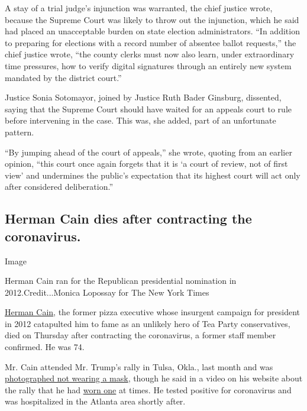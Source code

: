 A stay of a trial judge's injunction was warranted, the chief justice
wrote, because the Supreme Court was likely to throw out the injunction,
which he said had placed an unacceptable burden on state election
administrators. ``In addition to preparing for elections with a record
number of absentee ballot requests,'' the chief justice wrote, ``the
county clerks must now also learn, under extraordinary time pressures,
how to verify digital signatures through an entirely new system mandated
by the district court.''

Justice Sonia Sotomayor, joined by Justice Ruth Bader Ginsburg,
dissented, saying that the Supreme Court should have waited for an
appeals court to rule before intervening in the case. This was, she
added, part of an unfortunate pattern.

``By jumping ahead of the court of appeals,'' she wrote, quoting from an
earlier opinion, ``this court once again forgets that it is `a court of
review, not of first view' and undermines the public's expectation that
its highest court will act only after considered deliberation.''

\hypertarget{herman-cain-dies-after-contracting-the-coronavirus}{%
\subsection{Herman Cain dies after contracting the
coronavirus.}\label{herman-cain-dies-after-contracting-the-coronavirus}}

Image

Herman Cain ran for the Republican presidential nomination in
2012.Credit...Monica Lopossay for The New York Times

\href{https://www.nytimes3xbfgragh.onion/2020/07/30/us/politics/herman-cain-dead.html}{Herman
Cain}, the former pizza executive whose insurgent campaign for president
in 2012 catapulted him to fame as an unlikely hero of Tea Party
conservatives, died on Thursday after contracting the coronavirus, a
former staff member confirmed. He was 74.

Mr. Cain attended Mr. Trump's rally in Tulsa, Okla., last month and was
\href{https://twitter.com/THEHermanCain/status/1274489632886075398?s=20}{photographed
not wearing a mask}, though he said in a video on his website about the
rally that he had
\href{https://hermancain.com/trump-tulsa-rally-i-was-there/}{worn one}
at times. He tested positive for coronavirus and was hospitalized in the
Atlanta area shortly after.

